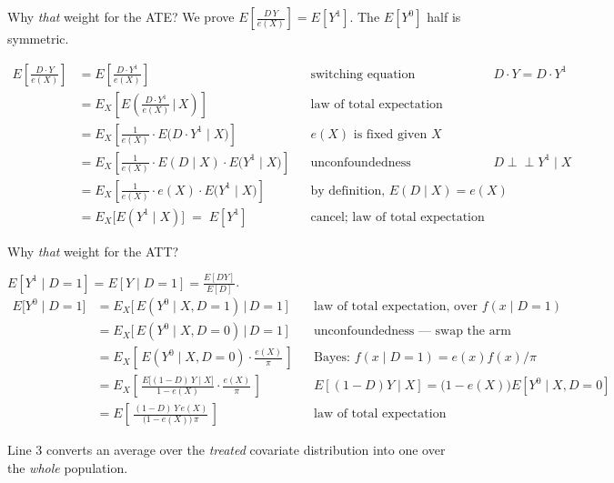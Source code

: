 \documentclass[
  11pt,
  ignorenonframetext,
  aspectratio=169,
]{beamer}
\newcommand{\indep}{\perp\!\!\!\perp}
\begin{document}
\begin{frame}{Why \emph{that} weight for the ATE?}
\protect{}\label{why-that-weight-for-the-ate}
We prove \(E\!\left[\frac{D\,Y}{e(X)}\right] = E[Y^1]\). The \(E[Y^0]\)
half is symmetric.

\scriptsize

\[
\begin{aligned}
E\!\left[ \frac{D \cdot Y}{e(X)} \right]
  &= E\!\left[ \frac{D \cdot Y^1}{e(X)} \right]
     && \text{switching equation (consistency): } D \cdot Y = D \cdot Y^1 \\
  &= E_X\!\left[ E\!\left( \frac{D \cdot Y^1}{e(X)} \,\Big|\, X \right) \right]
     && \text{law of total expectation} \\
  &= E_X\!\left[ \frac{1}{e(X)} \cdot E\big(D \cdot Y^1 \mid X\big) \right]
     && e(X) \text{ is fixed given } X \\
  &= E_X\!\left[ \frac{1}{e(X)} \cdot E(D \mid X) \cdot E\big(Y^1 \mid X\big) \right]
     && \text{unconfoundedness (exchangeability): } D \indep Y^1 \mid X \\
  &= E_X\!\left[ \frac{1}{e(X)} \cdot e(X) \cdot E\big(Y^1 \mid X\big) \right]
     && \text{by definition, } E(D \mid X) = e(X) \\
  &= E_X\big[ E(Y^1 \mid X) \big] \;=\; E[Y^1]
     && \text{cancel; law of total expectation}
\end{aligned}
\]
\end{frame}

\begin{frame}{Why \emph{that} weight for the ATT?}
\protect{}\label{why-that-weight-for-the-att}
\scriptsize

\(E[Y^1 \mid D{=}1] = E[Y \mid D{=}1] = \frac{E[DY]}{E[D]}\). \[
\begin{aligned}
E\big[Y^0 \mid D{=}1\big]
  &= E_X\big[\, E(Y^0 \mid X, D{=}1) \,\big|\, D{=}1 \,\big]
     && \text{law of total expectation, over } f(x \mid D{=}1) \\
  &= E_X\big[\, E(Y^0 \mid X, D{=}0) \,\big|\, D{=}1 \,\big]
     && \text{unconfoundedness --- swap the arm} \\
  &= E_X\!\left[\, E(Y^0 \mid X, D{=}0)\cdot\frac{e(X)}{\pi} \,\right]
     && \text{Bayes: } f(x \mid D{=}1) = e(x)f(x)/\pi \\
  &= E_X\!\left[\, \frac{E\big[(1-D)\,Y \mid X\big]}{1 - e(X)}\cdot\frac{e(X)}{\pi} \,\right]
     && E[(1{-}D)Y \mid X] = \big(1{-}e(X)\big)E[Y^0 \mid X, D{=}0] \\
  &= E\!\left[\, \frac{(1 - D)\,Y\,e(X)}{\big(1 - e(X)\big)\,\pi} \,\right]
     && \text{law of total expectation}
\end{aligned}
\] \normalsize

Line 3 converts an average over the \emph{treated} covariate
distribution into one over the \emph{whole} population.
\end{frame}
\end{document}
